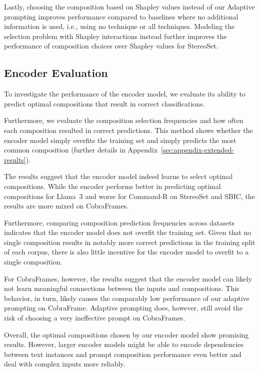 Lastly, choosing the composition based on Shapley values instead of our Adaptive prompting improves performance compared to baselines where no additional information is used, i.e., using no technique or all techniques. Modeling the selection problem with Shapley interactions instead further improves the performance of composition choices over Shapley values for StereoSet.


\subsection{Encoder Evaluation}

To investigate the performance of the encoder model, we evaluate its ability to predict optimal compositions that result in correct classifications.

Furthermore, we evaluate the composition selection frequencies and how often each composition resulted in correct predictions. This method shows whether the encoder model simply overfits the training set and simply predicts the most common composition (further details in  Appendix~\ref{sec:appendix-extended-results}).

The results suggest that the encoder model indeed learns to select optimal compositions. While the encoder performs better in predicting optimal compositions for Llama~3 and worse for Command-R on StereoSet and SBIC, the results are more mixed on CobraFrames.

Furthermore, comparing composition prediction frequencies across datasets indicates that the encoder model does not overfit the training set. Given that no single composition results in notably more correct predictions in the training split of each corpus, there is also little incentive for the encoder model to overfit to a single composition.

For CobraFrames, however, the results suggest that the encoder model can likely not learn meaningful connections between the inputs and compositions. This behavior, in turn, likely causes the comparably low performance of our adaptive prompting on CobraFrame. Adaptive prompting does, however, still avoid the risk of choosing a very ineffective prompt on CobraFrames.

Overall, the optimal compositions chosen by our encoder model show promising results. However, larger encoder models might be able to encode dependencies between text instances and prompt composition performance even better and deal with complex inputs more reliably.



